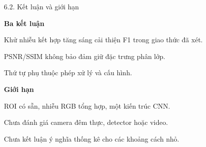 \documentclass[aspectratio=169,10pt]{beamer}
\newcommand{\insertpaperreference}{}
\newcommand{\paperreference}[1]{\gdef\insertpaperreference{#1}}
\begin{document}
\paperreference{}
\begin{frame}{6.2. Kết luận và giới hạn}

\textbf{Ba kết luận}\par
Khử nhiễu kết hợp tăng sáng cải thiện F1 trong giao thức đã xét.\par
PSNR/SSIM không bảo đảm giữ đặc trưng phân lớp.\par
Thứ tự phụ thuộc phép xử lý và cấu hình.\par\vspace{3mm}
\textbf{Giới hạn}\par
ROI có sẵn, nhiễu RGB tổng hợp, một kiến trúc CNN.\par
Chưa đánh giá camera đêm thực, detector hoặc video.\par
Chưa kết luận ý nghĩa thống kê cho các khoảng cách nhỏ.
\par{}

\end{frame}
\end{document}
